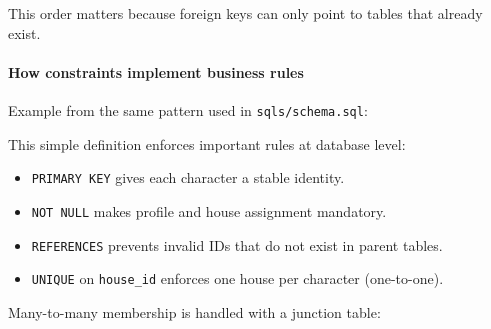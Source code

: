 This order matters because foreign keys can only point to tables that
already exist.

\hypertarget{how-constraints-implement-business-rules}{%
\paragraph{How constraints implement business
rules}\label{how-constraints-implement-business-rules}}

Example from the same pattern used in \texttt{sqls/schema.sql}:

\begin{Shaded}
\begin{Highlighting}[]
 
     \NormalTok{,}
   \NormalTok{),}
    \NormalTok{)}
\NormalTok{);}
\end{Highlighting}
\end{Shaded}

This simple definition enforces important rules at database level:

\begin{itemize}
\tightlist
\item
  \texttt{PRIMARY\ KEY} gives each character a stable identity.
\item
  \texttt{NOT\ NULL} makes profile and house assignment mandatory.
\item
  \texttt{REFERENCES} prevents invalid IDs that do not exist in parent
  tables.
\item
  \texttt{UNIQUE} on \texttt{house\_id} enforces one house per character
  (one-to-one).
\end{itemize}

Many-to-many membership is handled with a junction table:

\begin{Shaded}
\begin{Highlighting}[]
 
 \NormalTok{),}
 \NormalTok{),}
\NormalTok{,}
     
\NormalTok{);}
\end{Highlighting}
\end{Shaded}

